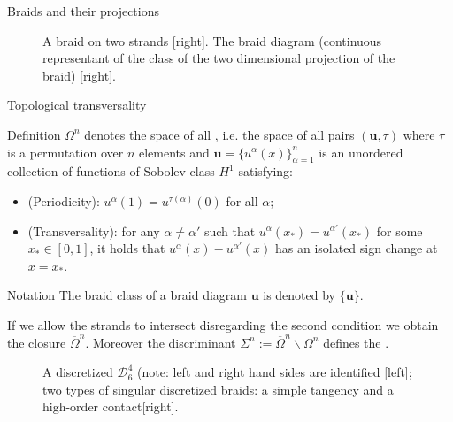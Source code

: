 \documentclass[9pt, english]{beamer}
\theoremstyle{definition}
\newcommand{\simbolovettore}[1]{{\boldsymbol{#1}}}
\newcommand{\vu}{\simbolovettore{u}}
\begin{document}
\begin{frame}{Braids and their projections}
\begin{figure}\label{fig:braiddiagram}
        \caption{A braid on two strands [right]. The braid diagram (continuous
         representant of the class of the two dimensional projection of the braid) [right].}
        \end{figure}
\end{frame}
\begin{frame}{Topological transversality}
        \begin{block}{Definition}
            $\Omega^n$ denotes the space of all
            {\color{green}{closed positive braid diagrams on $n$ strands pairwise
            transversal}\/}, i.e. the space of all pairs $(\vu, \tau)$ where $\tau$ is a permutation
            over $n$ elements and $\vu=\{u^\alpha(x)\}_{\alpha=1}^n$ is an unordered collection of functions of
            Sobolev class $H^1$ satisfying:
            \begin{itemize}
            \item (Periodicity): $u^\alpha(1)= u^{\tau(\alpha)}(0)$ for
            all $\alpha$;\pause
            \item (Transversality): for any $\alpha \neq \alpha'$ such
            that $u^\alpha(x_*) = u^{\alpha'}(x_*)$ for some $x_* \in
            [0,1]$, it holds that $u^\alpha(x)- u^{\alpha'}(x)$ has an
            isolated sign change at $x=x_*$.
            \end{itemize}
         \end{block}
\end{frame}
\begin{frame}
    \begin{block}{Notation}
            The braid class of a braid diagram $\vu$ is denoted by
            $\{\vu\}$.\pause

            If we allow the strands to intersect disregarding the
            second condition we obtain the closure
            $\overline \Omega^n$. Moreover the discriminant $\Sigma^n:= \overline \Omega^n \backslash \Omega^n$
            defines the {\color{red}{ singular braid diagrams}\/}.\pause
    \end{block}
        \begin{figure}\label{fig:discretized}
            \caption{A discretized $\mathscr D_6^4$ (note: left and right
            hand sides are identified [left]; two types of singular discretized braids: a simple
            tangency and a high-order contact[right].}
        \end{figure}
\end{frame}
\end{document}
